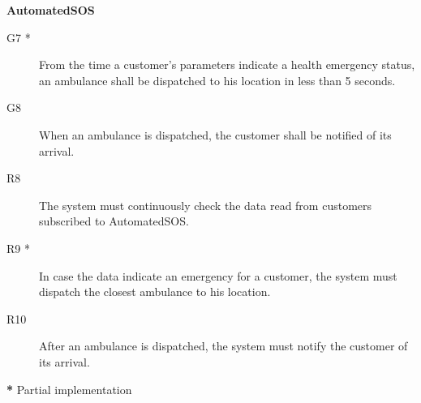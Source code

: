 \documentclass[../main.tex]{subfiles}
\begin{document}
\vspace{8mm}


	{\bf AutomatedSOS}

	\vspace{0.5cm}

	\begin{description}
		\item [G7 *]  From the time a customer's parameters indicate a health emergency status, an ambulance shall be dispatched to his location in less than 5 seconds.
		\item [G8]  When an ambulance is dispatched, the customer shall be notified of its arrival.

		\item [R8] The system must continuously check the data read from customers subscribed to AutomatedSOS.
		\item [R9 *] In case the data indicate an emergency for a customer, the system must dispatch the closest ambulance to his location.
		\item [R10] After an ambulance is dispatched, the system must notify the customer of its arrival.

	\end{description}


\textbf{*} Partial implementation
\end{document}
